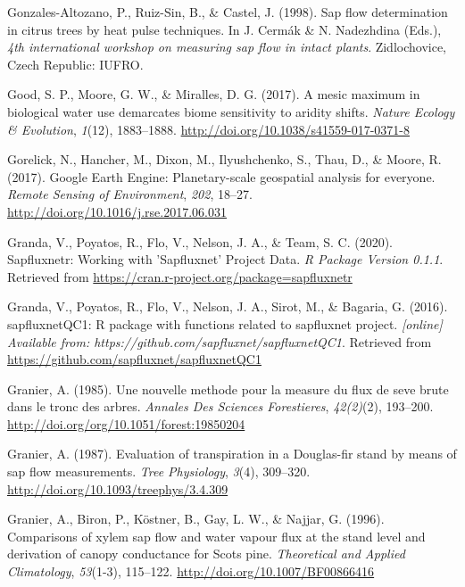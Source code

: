 \documentclass[11pt,twoside]{reedthesis}
\begin{document}
\hypertarget{ref-Gonzales-Altozano1998}{}
Gonzales-Altozano, P., Ruiz-Sin, B., \& Castel, J. (1998). Sap flow
determination in citrus trees by heat pulse techniques. In J. Cermák \&
N. Nadezhdina (Eds.), \emph{4th international workshop on measuring sap
flow in intact plants}. Zidlochovice, Czech Republic: IUFRO.

\hypertarget{ref-good2017}{}
Good, S. P., Moore, G. W., \& Miralles, D. G. (2017). A mesic maximum in
biological water use demarcates biome sensitivity to aridity shifts.
\emph{Nature Ecology \& Evolution}, \emph{1}(12), 1883--1888.
\url{http://doi.org/10.1038/s41559-017-0371-8}

\hypertarget{ref-gorelick_google_2017}{}
Gorelick, N., Hancher, M., Dixon, M., Ilyushchenko, S., Thau, D., \&
Moore, R. (2017). Google Earth Engine: Planetary-scale geospatial
analysis for everyone. \emph{Remote Sensing of Environment}, \emph{202},
18--27. \url{http://doi.org/10.1016/j.rse.2017.06.031}

\hypertarget{ref-granda_sapfluxnetr_2020}{}
Granda, V., Poyatos, R., Flo, V., Nelson, J. A., \& Team, S. C. (2020).
Sapfluxnetr: Working with 'Sapfluxnet' Project Data. \emph{R Package
Version 0.1.1}. Retrieved from
\url{https://cran.r-project.org/package=sapfluxnetr}

\hypertarget{ref-granda2016}{}
Granda, V., Poyatos, R., Flo, V., Nelson, J. A., Sirot, M., \& Bagaria,
G. (2016). sapfluxnetQC1: R package with functions related to sapfluxnet
project. \emph{{[}online{]} Available from:
https://github.com/sapfluxnet/sapfluxnetQC1}. Retrieved from
\url{https://github.com/sapfluxnet/sapfluxnetQC1}

\hypertarget{ref-Granier1985}{}
Granier, A. (1985). Une nouvelle methode pour la measure du flux de seve
brute dans le tronc des arbres. \emph{Annales Des Sciences Forestieres},
\emph{42(2)}(2), 193--200.
\url{http://doi.org/org/10.1051/forest:19850204}

\hypertarget{ref-Granier1987}{}
Granier, A. (1987). Evaluation of transpiration in a Douglas-fir stand
by means of sap flow measurements. \emph{Tree Physiology}, \emph{3}(4),
309--320. \url{http://doi.org/10.1093/treephys/3.4.309}

\hypertarget{ref-Granier1996}{}
Granier, A., Biron, P., Köstner, B., Gay, L. W., \& Najjar, G. (1996).
Comparisons of xylem sap flow and water vapour flux at the stand level
and derivation of canopy conductance for Scots pine. \emph{Theoretical
and Applied Climatology}, \emph{53}(1-3), 115--122.
\url{http://doi.org/10.1007/BF00866416}
\end{document}
